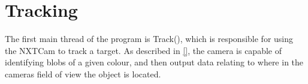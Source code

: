 \section{Tracking}
The first main thread of the program is Track(), which is responsible for using
the NXTCam to track a target. As described in \autoref{}, the camera is capable
of identifying blobs of a given colour, and then output data relating to where
in the cameras field of view the object is located. 
